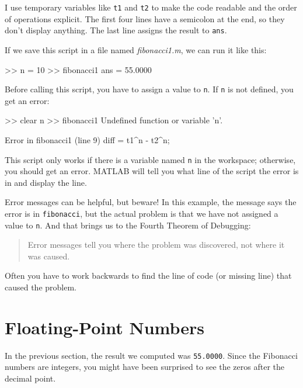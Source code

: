 I use temporary variables like \lstinline{t1} and \lstinline{t2} to make the code readable and the order of operations explicit.  The first four lines have a semicolon at the end, so they don't display anything.  The last line assigns the result to \lstinline{ans}.


If we save this script in a file named \emph{fibonacci1.m}, we can run it like this:

\begin{code}
>> n = 10
>> fibonacci1
ans = 55.0000
\end{code}

Before calling this script, you have to assign a value to \lstinline{n}.
If \lstinline{n} is not defined, you get an error:

\begin{code}
>> clear n
>> fibonacci1
Undefined function or variable 'n'.

Error in fibonacci1 (line 9)
diff = t1^n - t2^n;
\end{code}

This script only works if there is a variable named \lstinline{n} in the workspace; otherwise, you should get an error.
MATLAB will tell you what line of the script the error is in and display the line.



Error messages can be helpful, but beware!
In this example, the message says the error is in \lstinline{fibonacci}, but the actual problem is that we have not assigned a value to \lstinline{n}.
And that brings us to the Fourth Theorem of Debugging:

\begin{quote}
Error messages tell you where the problem was discovered,
not where it was caused.
\end{quote}

Often you have to work backwards to find the line of code (or missing line) that caused the problem.

\section{Floating-Point Numbers}

In the previous section, the result we computed was \lstinline{55.0000}.  Since the Fibonacci numbers are integers, you might have been surprised to see the zeros after the decimal point.

